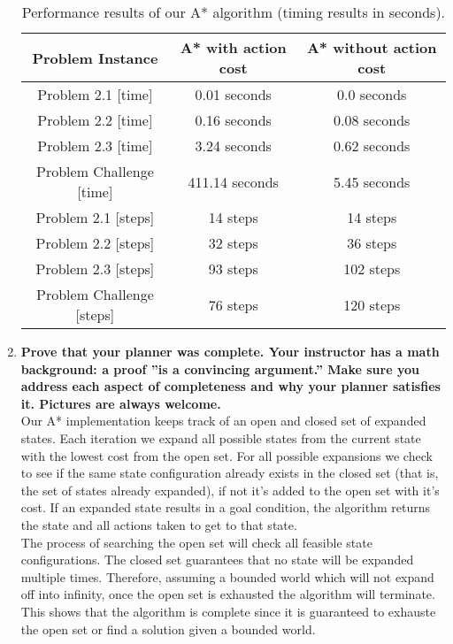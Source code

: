 \documentclass[12pt]{article}
\begin{document}
\begin{enumerate}
    \begin{table}%
    \label{table:results2}
    \caption{Performance results of our A* algorithm (timing results in seconds).}
    \begin{tabular*}{1.0\textwidth}{c|c|c}
    \hline
    \bfseries Problem Instance & \bfseries A* with action cost  & \bfseries A* without action cost \\
    \hline\hline
    Problem 2.1 [time] 		&  0.01 seconds &  0.0 seconds 	\\ \hline    
    Problem 2.2 [time] 		&  0.16 seconds &  0.08 seconds 	\\ \hline
    Problem 2.3 [time] 		&  3.24 seconds &  0.62 seconds 	\\ \hline
    Problem Challenge [time] 	&  411.14 seconds &  5.45 seconds 	\\ \hline\hline
    Problem 2.1 [steps]		&  14 steps &  14 steps 	\\ \hline
    Problem 2.2 [steps]		&  32 steps &  36 steps 	\\ \hline
    Problem 2.3 [steps]		&  93 steps &  102 steps 	\\ \hline
    Problem Challenge [steps]	&  76 steps &  120 steps 	\\ \hline
    \hline
    \end{tabular*}
    \end{table}
  \item \textbf{Prove that your planner was complete. Your instructor has a math background: a proof ”is
a convincing argument.” Make sure you address each aspect of completeness and why your
planner satisfies it. Pictures are always welcome.}\\
Our A* implementation keeps track of an open and closed set of expanded states. Each iteration we expand all possible states from the current state with the lowest cost from the open set. For all possible expansions we check to see if the same state configuration already exists in the closed set (that is, the set of states already expanded), if not it's added to the open set with it's cost. If an expanded state results in a goal condition, the algorithm returns the state and all actions taken to get to that state.\\
The process of searching the open set will check all feasible state configurations. The closed set guarantees that no state will be expanded multiple times. Therefore, assuming a bounded world which will not expand off into infinity, once the open set is exhausted the algorithm will terminate. This shows that the algorithm is complete since it is guaranteed to exhauste the open set or find a solution given a bounded world.


\end{enumerate}
\end{document}
